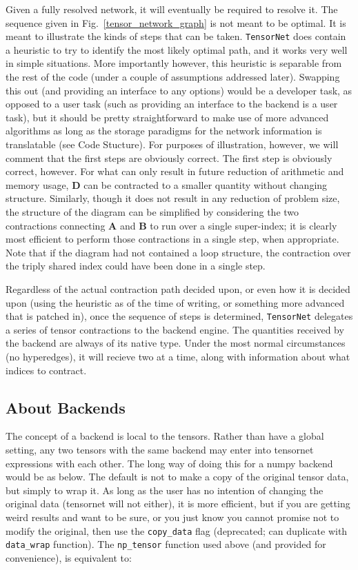 \documentclass[12pt,letterpaper]{article}
\begin{document}
Given a fully resolved network, it will eventually be required to resolve it.
The sequence given in Fig.~\ref{tensor_network_graph} is not meant to be optimal.
It is meant to illustrate the kinds of steps that can be taken.
\texttt{TensorNet} does contain a heuristic to try to identify the most likely optimal
 path, and it works very well in simple situations.
More importantly however, this heuristic is separable from the rest of the
 code (under a couple of assumptions addressed later).
Swapping this out (and providing an interface to any options) would be a developer task,
 as opposed to a user task (such as providing an interface to the backend is a user task), 
 but it should be pretty straightforward to make use of more advanced algorithms as long
 as the storage paradigms for the network information is translatable (see Code Stucture).
For purposes of illustration, however, we will comment that the first steps are 
 obviously correct.
The first step is obviously correct, however.
For what can only result in future reduction of arithmetic and memory usage, $\mathbf{D}$
 can be contracted to a smaller quantity without changing structure.
Similarly, though it does not result in any reduction of problem size, the structure of
 the diagram can be simplified by considering the two contractions connecting $\mathbf{A}$
 and $\mathbf{B}$ to run over a single super-index;
 it is clearly most efficient to perform those contractions in a single step, when appropriate.
Note that if the diagram had not contained a loop structure, the contraction over the
 triply shared index could have been done in a single step.

Regardless of the actual contraction path decided upon, or even how it is decided upon
 (using the heuristic as of the time of writing, or something more advanced that is patched in),
 once the sequence of steps is determined, \texttt{TensorNet} delegates a series of 
 tensor contractions to the backend engine.
The quantities received by the backend are always of its native type.
Under the most normal circumstances (no hyperedges), it will recieve two at a time,
 along with information about what indices to contract.

        \subsection{About Backends}

The concept of a backend is local to the tensors.  Rather than have a global setting,
any two tensors with the same backend may enter into tensornet expressions with each other.
The long way of doing this for a numpy backend would be as below.  The default is not to make
a copy of the original tensor data, but simply to wrap it.  As long as the user has no intention
of changing the original data (tensornet will not either), it is more efficient, but if you 
are getting weird results and want to be sure, or you just know you cannot promise not to
modify the original, then use the \texttt{copy\_data} flag (deprecated; can duplicate with \texttt{data\_wrap} function).
The \texttt{np\_tensor} function used above (and provided for convenience), is
equivalent to: 
\end{document}
